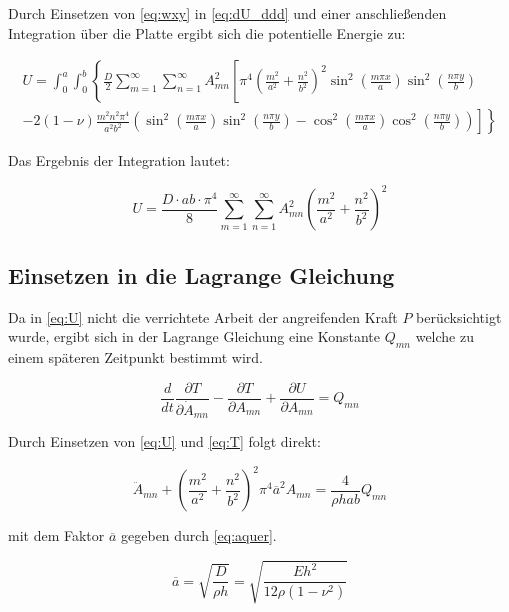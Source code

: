 Durch Einsetzen von \ref{eq:wxy} in \ref{eq:dU_ddd} und einer anschließenden Integration über die Platte ergibt sich die potentielle Energie zu:


\begin{multline}
U = \int_0^a \int_0^b \left\{
\frac{D}{2} \sum_{m = 1}^{\infty}\sum_{n = 1}^{\infty} A^2_{mn}
\left[
\pi^4 \left(\frac{m^2}{a^2} + \frac{n^2}{b^2}\right)^2
\sin^2\left(\frac{m\pi x}{a}\right) \sin^2\left(\frac{n\pi y}{b}\right)
\right.
\right. \\
\left.
\left.
-2(1-\nu) 
\frac{m^2n^2\pi^4}{a^2b^2}
\left(
\sin^2\left(\frac{m\pi x}{a}\right) 
\sin^2\left(\frac{n\pi y}{b}\right)
- 
\cos^2\left(\frac{m\pi x}{a}\right) 
\cos^2\left(\frac{n\pi y}{b}\right)
\right)
\right] 
\right\}
\end{multline}

Das Ergebnis der Integration lautet:

\begin{equation}
U = \dfrac{D \cdot a b \cdot \pi^4}{8} \sum_{m=1}^{\infty}  \sum_{n=1}^{\infty} A^2_{mn}  \left( \dfrac{m^2}{a^2} + \dfrac{n^2}{b^2}\right)^2
\label{eq:U}
\end{equation}

\subsection{Einsetzen in die Lagrange Gleichung}

Da in \ref{eq:U} nicht die verrichtete Arbeit der angreifenden Kraft $P$ berücksichtigt wurde, ergibt sich in der Lagrange Gleichung eine Konstante $Q_{mn}$ welche zu einem späteren Zeitpunkt bestimmt wird.

\begin{equation}
\dfrac{d}{dt} \dfrac{\partial T}{\partial \dot{A}_{mn}} - \dfrac{\partial T}{\partial A_{mn}} + \dfrac{\partial U}{\partial A_{mn}} = Q_{mn}
\end{equation}

Durch Einsetzen von \ref{eq:U} und \ref{eq:T} folgt direkt:

\begin{equation}
\ddot{A}_{mn} + \left(\dfrac{m^2}{a^2} + \dfrac{n^2}{b^2}\right)^2 \pi^4 \overline{a}^2 A_{mn} = \dfrac{4}{\rho h a b} Q_{mn}
\label{eq:lagrangeDGL}
\end{equation}

\newpage

mit dem Faktor $\overline{a}$ gegeben durch \ref{eq:aquer}.


\begin{equation}\overline{a} = \sqrt{\dfrac{D}{\rho h}} = \sqrt{\dfrac{E h^2}{12 \rho (1-\nu^2)}}
\label{eq:aquer}
\end{equation}

